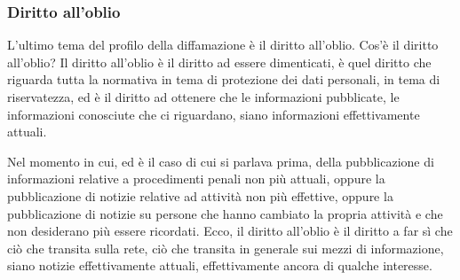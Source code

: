 \subsubsection{Diritto all'oblio}
 L'ultimo tema del profilo della diffamazione è il diritto all'oblio. Cos'è il diritto all'oblio? Il diritto all'oblio è il diritto ad essere dimenticati, è quel diritto che riguarda tutta la normativa in tema di protezione dei dati personali, in tema di riservatezza, ed è il diritto ad ottenere che le informazioni pubblicate, le informazioni conosciute che ci riguardano, siano informazioni effettivamente attuali.\par
 Nel momento in cui, ed è il caso di cui si parlava prima, della pubblicazione di informazioni relative a procedimenti penali non più attuali, oppure la pubblicazione di notizie relative ad attività non più effettive, oppure la pubblicazione di notizie su persone che hanno cambiato la propria attività e che non desiderano più essere ricordati. Ecco, il diritto all'oblio è il diritto a far sì che ciò che transita sulla rete, ciò che transita in generale sui mezzi di informazione, siano notizie effettivamente attuali, effettivamente ancora di qualche interesse.\par
 
